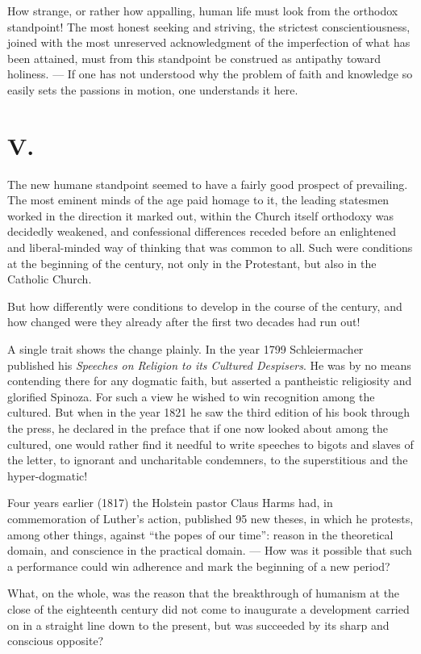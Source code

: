 \documentclass[12pt,a4paper]{article}
\begin{document}
How strange, or rather how appalling, human life must look from the orthodox
standpoint! The most honest seeking and striving, the strictest
conscientiousness, joined with the most unreserved acknowledgment of the
imperfection of what has been attained, must from this standpoint be construed
as antipathy toward holiness. --- If one has not understood why the problem of
faith and knowledge so easily sets the passions in motion, one understands it
here.

\section*{V.}

The new humane standpoint seemed to have a fairly good prospect of prevailing.
The most eminent minds of the age paid homage to it, the leading statesmen
worked in the direction it marked out, within the Church itself orthodoxy was
decidedly weakened, and confessional differences receded before an enlightened
and liberal-minded way of thinking that was common to all. Such were
conditions at the beginning of the century, not only in the Protestant, but
also in the Catholic Church.

But how differently were conditions to develop in the course of the century,
and how changed were they already after the first two decades had run out!

A single trait shows the change plainly. In the year 1799 Schleiermacher
published his \emph{Speeches on Religion to its Cultured Despisers}. He was by
no means contending there for any dogmatic faith, but asserted a pantheistic
religiosity and glorified Spinoza. For such a view he wished to win
recognition among the cultured. But when in the year 1821 he saw the third
edition of his book through the press, he declared in the preface that if one
now looked about among the cultured, one would rather find it needful to write
speeches to bigots and slaves of the letter, to ignorant and uncharitable
condemners, to the superstitious and the hyper-dogmatic!

Four years earlier (1817) the Holstein pastor Claus Harms had, in commemoration
of Luther's action, published 95 new theses, in which he protests, among other
things, against ``the popes of our time'': reason in the theoretical domain,
and conscience in the practical domain. --- How was it possible that such a
performance could win adherence and mark the beginning of a new period?

What, on the whole, was the reason that the breakthrough of humanism at the
close of the eighteenth century did not come to inaugurate a development
carried on in a straight line down to the present, but was succeeded by its
sharp and conscious opposite?
\end{document}
